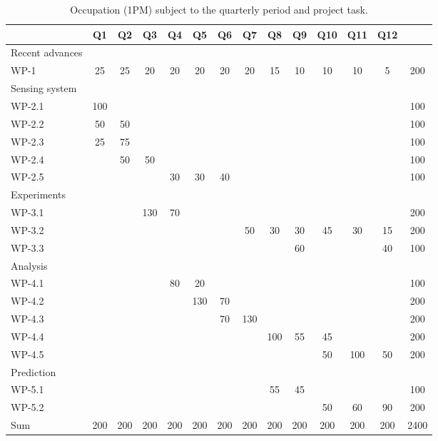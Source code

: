 \documentclass[12pt]{article}
\begin{document}
\begin{table}[t]
	\centering
	\begin{footnotesize}
		\begin{tabular}{|l||c|c|c|c|c|c|c|c|c|c|c|c||c|}
			\hline
			& Q1	&Q2	&Q3	&Q4	&Q5	&Q6	&Q7	&Q8	&Q9	&Q10	&Q11	&Q12	&\\\hline\hline
			Recent advances& &	&	&	&	&	&	&	&	&	&	& 	&\\
			WP-1	&25	&25	&20	&20	&20	&20	&20	&15	&10	&10	&10	&5 	& 200\\\hline
			Sensing system& &	&	&	&	&	&	&	&	&	&	& 	&\\
			WP-2.1	&100	&	&	&	&	&	&	&	&	&	&	& 	& 100\\
			WP-2.2	&50	&50	&	&	&	&	&	&	&	&	&	& 	& 100\\
			WP-2.3	&25	&75	&	&	&	&	&	&	&	&	&	& 	& 100\\
			WP-2.4	&	&50	&50	&	&	&	&	&	&	&	&	& 	& 100\\
			WP-2.5	&	&	&	&30	&30	&40	&	&	&	&	&	& 	& 100\\\hline
			Experiments& &	&	&	&	&	&	&	&	&	&	&	&\\
			WP-3.1	&	&	&130	&70	&	&	&	&	&	&	&	& 	& 200\\
			WP-3.2	&	&	&	&	&	&	&50	&30	&30	&45	&30	&15 	& 200\\
			WP-3.3	&	&	&	&	&	&	&	&	&60	&	&	&40 	& 100\\\hline
			Analysis& &	&	&	&	&	&	&	&	&	&	& 	&\\
			WP-4.1	&	&	&	&80	&20	&	&	&	&	&	&	& 	& 100\\
			WP-4.2	&	&	&	&	&130	&70	&	&	&	&	&	& 	& 200\\
			WP-4.3	&	&	&	&	&	&70	&130	&	&	&	&	& 	& 200\\
			WP-4.4	&	&	&	&	&	&	&	&100	&55	&45	&	& 	& 200\\
			WP-4.5	&	&	&	&	&	&	&	&	&	&50	&100	&50 	& 200\\\hline
			Prediction& &	&	&	&	&	&	&	&	&	&	& &\\
			WP-5.1	&	&	&	&	&	&	&	&55	 &45	&	&	&	& 100\\%
			WP-5.2	&	&	&	&	&	&	&	&	 &	&50	&60	&90	& 200\\\hline
			Sum	& 200	&200	&200	&200	&200	&200	&200	&200	 &200	&200	&200	&200	& 2400\\\hline
		\end{tabular}
	\end{footnotesize}
	\caption{Occupation (1PM) subject to the quarterly period and project task.}
	\label{tableGesamtueberblick}
\end{table}
\end{document}
